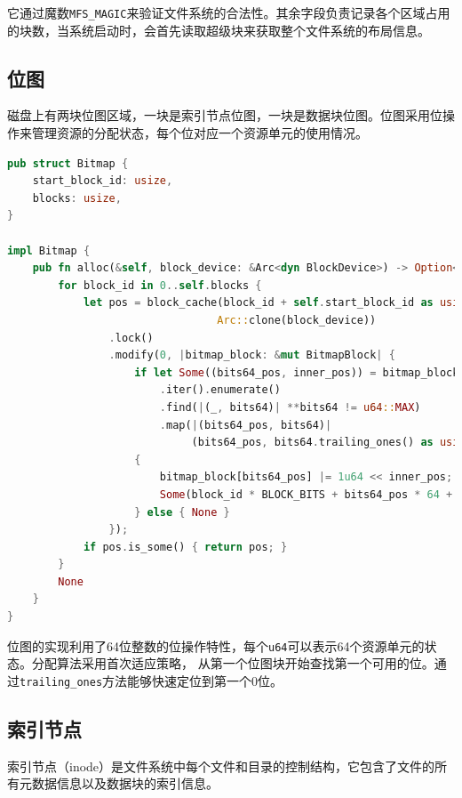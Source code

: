 它通过魔数\texttt{MFS\_MAGIC}来验证文件系统的合法性。其余字段负责记录各个区域占用的块数，当系统启动时，会首先读取超级块来获取整个文件系统的布局信息。

\subsection{位图}

磁盘上有两块位图区域，一块是索引节点位图，一块是数据块位图。位图采用位操作来管理资源的分配状态，每个位对应一个资源单元的使用情况。

\begin{lstlisting}[language=Rust]
pub struct Bitmap {
    start_block_id: usize,
    blocks: usize,
}

impl Bitmap {
    pub fn alloc(&self, block_device: &Arc<dyn BlockDevice>) -> Option<usize> {
        for block_id in 0..self.blocks {
            let pos = block_cache(block_id + self.start_block_id as usize,
                                 Arc::clone(block_device))
                .lock()
                .modify(0, |bitmap_block: &mut BitmapBlock| {
                    if let Some((bits64_pos, inner_pos)) = bitmap_block
                        .iter().enumerate()
                        .find(|(_, bits64)| **bits64 != u64::MAX)
                        .map(|(bits64_pos, bits64)| 
                             (bits64_pos, bits64.trailing_ones() as usize))
                    {
                        bitmap_block[bits64_pos] |= 1u64 << inner_pos;
                        Some(block_id * BLOCK_BITS + bits64_pos * 64 + inner_pos)
                    } else { None }
                });
            if pos.is_some() { return pos; }
        }
        None
    }
}
\end{lstlisting}

位图的实现利用了64位整数的位操作特性，每个\texttt{u64}可以表示64个资源单元的状态。分配算法采用首次适应策略，
从第一个位图块开始查找第一个可用的位。通过\texttt{trailing\_ones}方法能够快速定位到第一个0位。

\subsection{索引节点}

索引节点（inode）是文件系统中每个文件和目录的控制结构，它包含了文件的所有元数据信息以及数据块的索引信息。

